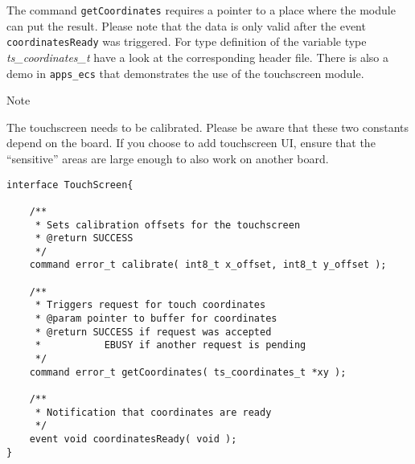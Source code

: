 \documentclass[a4paper,10pt]{article}
\newenvironment{note}[1][Note]{%
	\begin{bclogo}[noborder=true,logo=\bcinfo]{#1}
}
{\end{bclogo}}
\begin{document}
The command \texttt{getCoordinates} requires a pointer to a place where the
	module can put the result.
Please note that the data is only valid after the event
	\texttt{coordinatesReady} was triggered.
For type definition of the variable type \emph{ts\_coordinates\_t} have a look
	at the corresponding header file.
There is also a demo in \texttt{apps\_ecs} that demonstrates the use of the
	touchscreen module.

\begin{note}
	The touchscreen needs to be calibrated.
	Please be aware that these two constants depend on the board.
	If you choose to add touchscreen UI, ensure that the ``sensitive'' areas
		are large enough to also work on another board.
\end{note}

\begin{lstlisting}[caption={TouchScreen},label=intf:touch]
interface TouchScreen{

    /**
     * Sets calibration offsets for the touchscreen
     * @return SUCCESS
     */
    command error_t calibrate( int8_t x_offset, int8_t y_offset );

    /**
     * Triggers request for touch coordinates
     * @param pointer to buffer for coordinates
     * @return SUCCESS if request was accepted
     *           EBUSY if another request is pending
     */
    command error_t getCoordinates( ts_coordinates_t *xy );

    /**
     * Notification that coordinates are ready
     */
    event void coordinatesReady( void );
}
\end{lstlisting}
\end{document}
